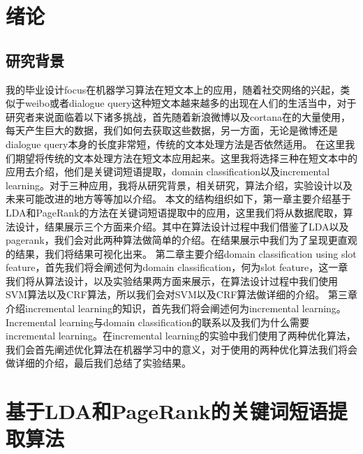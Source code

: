 \documentclass[master]{njuthesis}
\begin{document}
\listoftables

\mainmatter


\chapter{绪论}\label{chapter_introduction}
\section{研究背景}

我的毕业设计focus在机器学习算法在短文本上的应用，随着社交网络的兴起，类似于weibo或者dialogue query这种短文本越来越多的出现在人们的生活当中，对于研究者来说面临着以下诸多挑战，首先随着新浪微博以及cortana在的大量使用，每天产生巨大的数据，我们如何去获取这些数据，另一方面，无论是微博还是dialogue query本身的长度非常短，传统的文本处理方法是否依然适用。
在这里我们期望将传统的文本处理方法在短文本应用起来。这里我将选择三种在短文本中的应用去介绍，他们是关键词短语提取，domain classification以及incremental learning。对于三种应用，我将从研究背景，相关研究，算法介绍，实验设计以及未来可能改进的地方等等加以介绍。
本文的结构组织如下，第一章主要介绍基于LDA和PageRank的方法在关键词短语提取中的应用，这里我们将从数据爬取，算法设计，结果展示三个方面来介绍。其中在算法设计过程中我们借鉴了LDA以及pagerank，我们会对此两种算法做简单的介绍。在结果展示中我们为了呈现更直观的结果，我们将结果可视化出来。
第二章主要介绍domain classification using slot feature，首先我们将会阐述何为domain classification，何为slot feature，这一章我们将从算法设计，以及实验结果两方面来展示，在算法设计过程中我们使用SVM算法以及CRF算法，所以我们会对SVM以及CRF算法做详细的介绍。
第三章介绍incremental learning的知识，首先我们将会阐述何为incremental learning。Incremental learning与domain classification的联系以及我们为什么需要incremental learning。在incremental learning的实验中我们使用了两种优化算法，我们会首先阐述优化算法在机器学习中的意义，对于使用的两种优化算法我们将会做详细的介绍，最后我们总结了实验结果。

\chapter{基于LDA和PageRank的关键词短语提取算法}\label{chapter_smallworld}
\end{document}
